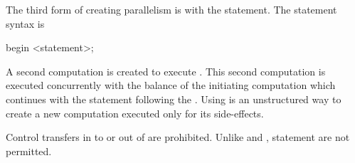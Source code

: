 The third form of creating parallelism is with the 
statement. The  statement syntax is
\begin{chapel}
begin <statement>;
\end{chapel}
A second computation is created to execute .
This second computation is executed concurrently with the balance of
the initiating computation which continues with the statement
following the . Using  is an unstructured way to 
create a new computation executed only for its side-effects.

Control transfers in to or out of  are prohibited. Unlike
 and ,  statement are not permitted.

